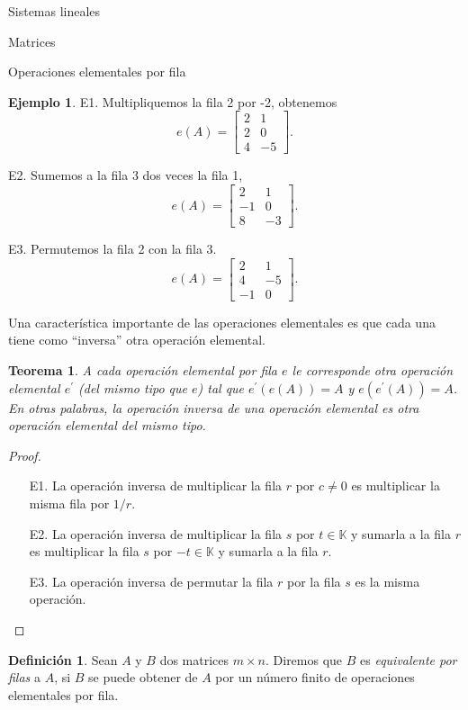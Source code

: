 \documentclass[a4paper,12pt,twoside,spanish,reqno]{amsbook}
\newtheorem{teorema}{Teorema}[section]
\theoremstyle{definition}
\newtheorem{definicion}{Definici\'on}[section]
\newtheorem{ejemplo}{Ejemplo}[section]
\theoremstyle{remark}
\newcommand{\K}{\mathbb K}
\begin{document}
\begin{chapter}{Sistemas lineales}
\begin{section}{Matrices}
\begin{subsection}{Operaciones elementales por fila}
\begin{ejemplo}
					E1. Multipliquemos la fila 2 por -2, obtenemos
					$$
					e(A) = 
					\begin{bmatrix}
					2&1\\2&0\\4&-5
					\end{bmatrix}.
					$$
					
					E2. Sumemos a la fila 3 dos veces la fila 1,
					$$
					e(A) = 
					\begin{bmatrix}
					2&1\\-1&0\\8&-3
					\end{bmatrix}.
					$$
					
					E3. Permutemos la fila 2 con la fila 3.
					$$
					e(A) = 
					\begin{bmatrix}
					2&1\\4&-5\\-1&0
					\end{bmatrix}.
					$$
				\end{ejemplo}
				
				Una característica importante de las operaciones elementales es que cada una tiene como ``inversa'' otra operación elemental. 
				
				\begin{teorema}\label{op-elem}
					A cada operación elemental por fila $e$ le corresponde otra operación elemental $e^\prime$ (del mismo tipo que $e$) tal que $e^\prime(e(A)) = A$ y $e(e^\prime(A)) = A$. En otras palabras, la operación inversa de una operación elemental es otra operación elemental del mismo tipo.  
				\end{teorema}
				\begin{proof} \
					\begin{enumerate}
						\item[E1.] La operación inversa de multiplicar la fila $r$ por $c\not=0$ es multiplicar la misma fila por $1/r$.
						\item[E2.] La operación inversa de multiplicar la fila $s$ por  $t \in \K$ y sumarla a la fila $r$ es multiplicar  la fila $s$ por  $-t \in \K$ y sumarla a la fila $r$.
						\item[E3.] La operación inversa de permutar la fila $r$ por la fila $s$ es la misma operación.
					\end{enumerate}
				\end{proof}
				
				\begin{definicion} 
					Sean $A$ y $B$ dos matrices $m \times n$. Diremos que $B$ es \textit{equivalente por filas} a $A$, si $B$ se puede obtener de $A$ por un número finito de operaciones elementales por fila. 
				\end{definicion}
			


\end{subsection}
\end{section}
\end{chapter}
\end{document}

